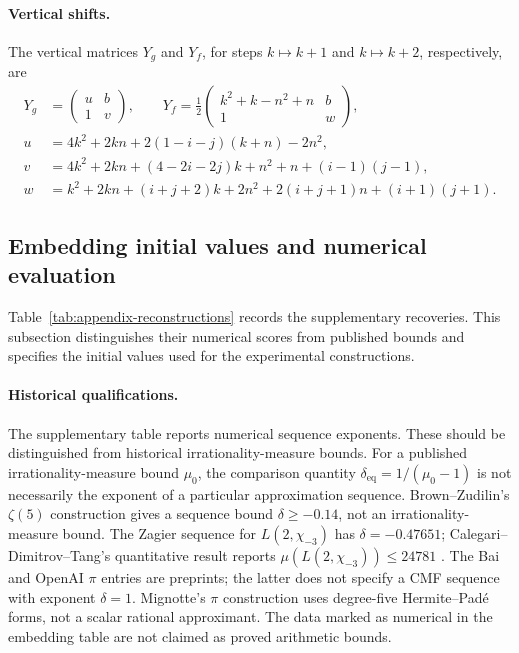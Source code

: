 \documentclass[oneside,english,11pt]{amsart}
\begin{document}
\paragraph{\textbf{Vertical shifts.}}
The vertical matrices $Y_g$ and $Y_f$, for steps $k\mapsto k+1$ and $k\mapsto k+2$, respectively, are
\[
\begin{aligned}
Y_g&=\begin{pmatrix}u&b\\1&v\end{pmatrix},\qquad
Y_f=\tfrac12\begin{pmatrix}k^2+k-n^2+n&b\\1&w\end{pmatrix},\\
u&=4k^2+2kn+2(1-i-j)(k+n)-2n^2,\\
v&=4k^2+2kn+(4-2i-2j)k+n^2+n+(i-1)(j-1),\\
w&=k^2+2kn+(i+j+2)k+2n^2+2(i+j+1)n+(i+1)(j+1).
\end{aligned}
\]


\subsection{Embedding initial values and numerical evaluation}
\label{app:cmf-recoveries}
Table~\ref{tab:appendix-reconstructions} records the supplementary
recoveries. This subsection distinguishes their numerical scores from
published bounds and specifies the initial values used for the
experimental constructions.

\paragraph{Historical qualifications.}
The supplementary table reports numerical sequence exponents. These
should be distinguished from historical irrationality-measure bounds.
For a published irrationality-measure bound $\mu_0$, the comparison quantity
$\delta_{\mathrm{eq}}=1/(\mu_0-1)$ is not necessarily the exponent of a
particular approximation sequence. Brown--Zudilin's $\zeta(5)$ construction
\cite{brownZudilin2022zeta5}
gives a sequence bound $\delta\geq-0.14$, not an irrationality-measure bound.
The Zagier sequence for $L(2,\chi_{-3})$ has $\delta=-0.47651$;
Calegari--Dimitrov--Tang's quantitative result reports
$\mu(L(2,\chi_{-3}))\leq24781$ \cite{calegariDimitrovTang2025Holonomy}.
The Bai and OpenAI $\pi$ entries are preprints; the latter does not specify
a CMF sequence with exponent $\delta=1$. Mignotte's $\pi$ construction
uses degree-five Hermite--Pad\'e forms, not a scalar rational approximant.
The data marked as numerical in the embedding table are not claimed as proved
arithmetic bounds.
\end{document}
